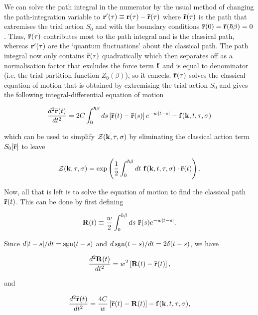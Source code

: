 We can solve the path integral in the numerator by the usual method of changing the path-integration variable to $\vb{r'}(\tau) \equiv \vb{r}(\tau) - \vb{\bar{r}}(\tau)$ where $\vb{\bar{r}}(\tau)$ is the path that extremises the trial action $S_0$ and with the boundary conditions $\vb{\bar{r}}(0) = \vb{\bar{r}}(\hbar\beta) = 0$. Thus, $\vb{\bar{r}}(\tau)$ contributes most to the path integral and is the classical path, whereas $\vb{r'}(\tau)$ are the `quantum fluctuations' about the classical path. The path integral now only contains $\vb{\bar{r}}(\tau)$ quadratically which then separates off as a normalisation factor that excludes the force term $\vb{f}$ and is equal to denominator (i.e. the trial partition function $Z_0(\beta)$), so it cancels. $\vb{\bar{r}}(\tau)$ solves the classical equation of motion that is obtained by extremising the trial action $S_0$ and gives the following integral-differential equation of motion

\begin{equation}
    \frac{d^2 \vb{\bar{r}}(t)}{dt^2} = 2C \int^{\hbar\beta}_0 ds \left[\vb{\bar{r}}(t) - \vb{\bar{r}}(s)\right] e^{-w\abs{t - s}} - \vb{f}(\vb{k}, t, \tau, \sigma) 
\end{equation}

which can be used to simplify $\mathcal{Z}(\vb{k}, \tau, \sigma)$ by eliminating the classical action term $S_0[\vb{\bar{r}}]$ to leave

\begin{equation}
    \mathcal{Z}(\vb{k}, \tau, \sigma) = \exp\left( \frac{1}{2} \int^{\hbar\beta}_0 dt\ \vb{f}(\vb{k}, t, \tau, \sigma) \cdot \vb{\bar{r}}(t) \right).
\end{equation}

Now, all that is left is to solve the equation of motion to find the classical path $\vb{\bar{r}}(t)$. This can be done by first defining 

\begin{equation}
    \vb{R}(t) \equiv \frac{w}{2} \int^{\hbar\beta}_0 ds\ \vb{\bar{r}}(s) e^{-w\abs{t - s}}.
\end{equation}

Since $d\abs{t-s}/dt = \operatorname{sgn}(t-s)$ and $d\operatorname{sgn}(t-s)/dt = 2\delta(t-s)$, we have

\begin{equation}
    \frac{d^2\vb{R}(t)}{dt^2} = w^2 \left[\vb{R}(t) - \vb{\bar{r}}(t)\right],
\end{equation}

and

\begin{equation}
    \frac{d^2 \vb{\bar{r}}(t)}{dt^2} = \frac{4C}{w} \left[\vb{\bar{r}}(t) - \vb{R}(t)\right] - \vb{f}(\vb{k}, t, \tau, \sigma) ,
\end{equation}

